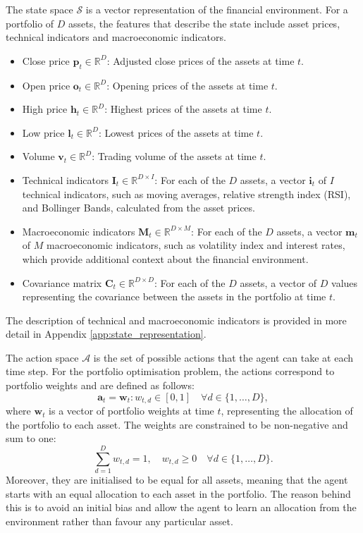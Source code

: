 The state space $\mathcal{S}$ is a vector representation of the financial environment. For a portfolio of $D$ assets, the features that describe the state include asset prices, technical indicators and macroeconomic indicators.
\begin{itemize}
    \item Close price $\mathbf{p}_t \in \mathbb{R}^D$: Adjusted close prices of the assets at time $t$.
    \item Open price $\mathbf{o}_t \in \mathbb{R}^D$: Opening prices of the assets at time $t$.
    \item High price $\mathbf{h}_t \in \mathbb{R}^D$: Highest prices of the assets at time $t$.
    \item Low price $\mathbf{l}_t \in \mathbb{R}^D$: Lowest prices of the assets at time $t$.
    \item Volume $\mathbf{v}_t \in \mathbb{R}^D$: Trading volume of the assets at time $t$.
    \item Technical indicators $\mathbf{I}_t \in \mathbb{R}^{D \times I}$: For each of the $D$ assets, a vector $\mathbf{i}_t$ of $I$ technical indicators, such as moving averages, relative strength index (RSI), and Bollinger Bands, calculated from the asset prices.
    \item Macroeconomic indicators $\mathbf{M}_t \in \mathbb{R}^{D \times M}$: For each of the $D$ assets, a vector $\mathbf{m}_t$ of $M$ macroeconomic indicators, such as volatility index and interest rates, which provide additional context about the financial environment.
    \item Covariance matrix $\mathbf{C}_t \in \mathbb{R}^{D \times D}$: For each of the $D$ assets, a vector of $D$ values representing the covariance between the assets in the portfolio at time $t$.
\end{itemize}

The description of technical and macroeconomic indicators is provided in more detail in Appendix \ref{app:state_representation}.

The action space $\mathcal{A}$ is the set of possible actions that the agent can take at each time step. For the portfolio optimisation problem, the actions correspond to portfolio weights and are defined as follows:
\begin{equation}
    \mathbf{a}_t = \mathbf{w}_t : w_{t,d} \in [0, 1] \quad \forall d \in \{1, \ldots, D\},
\end{equation}
where $\mathbf{w}_t$ is a vector of portfolio weights at time $t$, representing the allocation of the portfolio to each asset. The weights are constrained to be non-negative and sum to one:
\begin{equation}
    \sum_{d=1}^D w_{t,d} = 1, \quad w_{t,d} \geq 0 \quad \forall d \in \{1, \ldots, D\}.
\end{equation}
Moreover, they are initialised to be equal for all assets, meaning that the agent starts with an equal allocation to each asset in the portfolio. The reason behind this is to avoid an initial bias and allow the agent to learn an allocation from the environment rather than favour any particular asset.

